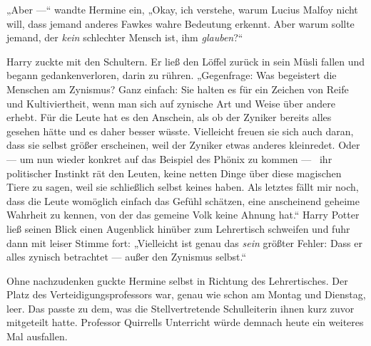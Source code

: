 „Aber —“ wandte Hermine ein,
„Okay, ich verstehe, warum Lucius Malfoy nicht will, dass jemand anderes Fawkes wahre Bedeutung erkennt. Aber warum sollte jemand, der \emph{kein} schlechter Mensch ist, ihm \emph{glauben}?“

Harry zuckte mit den Schultern. Er ließ den Löffel zurück in sein Müsli fallen und begann gedankenverloren, darin zu rühren.
„Gegenfrage: Was begeistert die Menschen am Zynismus? Ganz einfach: Sie halten es für ein Zeichen von Reife und Kultiviertheit, wenn man sich auf zynische Art und Weise über andere erhebt. Für die Leute hat es den Anschein, als ob der Zyniker bereits alles gesehen hätte und es daher besser wüsste. Vielleicht freuen sie sich auch daran, dass sie selbst größer erscheinen, weil der Zyniker etwas anderes kleinredet. Oder — um nun wieder konkret auf das Beispiel des Phönix zu kommen — ~ihr politischer Instinkt rät den Leuten, keine netten Dinge über diese magischen Tiere zu sagen, weil sie schließlich selbst keines haben. Als letztes fällt mir noch, dass die Leute womöglich einfach das Gefühl schätzen, eine anscheinend geheime Wahrheit zu kennen, von der das gemeine Volk keine Ahnung hat.“ Harry Potter ließ seinen Blick einen Augenblick hinüber zum Lehrertisch schweifen und fuhr dann mit leiser Stimme fort:
„Vielleicht ist genau das \emph{sein} größter Fehler: Dass er alles zynisch betrachtet — außer den Zynismus selbst.“

Ohne nachzudenken guckte Hermine selbst in Richtung des Lehrertisches. Der Platz des Verteidigungsprofessors war, genau wie schon am Montag und Dienstag, leer. Das passte zu dem, was die Stellvertretende Schulleiterin ihnen kurz zuvor mitgeteilt hatte. Professor Quirrells Unterricht würde demnach heute ein weiteres Mal ausfallen.

